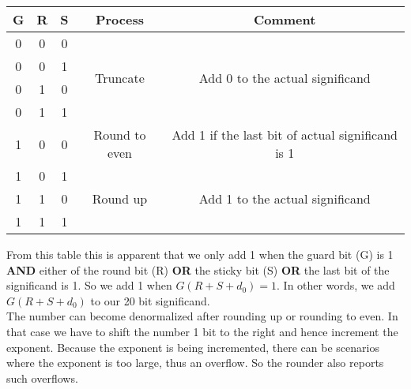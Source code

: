 \documentclass[14pt]{article}
\begin{document}
{
	\centering
	\begin{tabular}{|c|c|c|c|c|}
		\hline
		\textbf{G} & \textbf{R} & \textbf{S} & \textbf{Process} & \textbf{Comment}\\
		\hline
		0 & 0 & 0 & \multirow{4}{*}{Truncate} & \multirow{4}{*}{Add 0 to the actual significand}\\
		\cline{1-3}
		0 & 0 & 1 & &\\
		\cline{1-3}
		0 & 1 & 0 & &\\
		\cline{1-3}
		0 & 1 & 1 & &\\
		\hline
		1 & 0 & 0 & Round to even & Add 1 if the last bit of actual significand is 1\\
		\hline
		1 & 0 & 1 & \multirow{3}{*}{Round up} & \multirow{3}{*}{Add 1 to the actual significand}\\
		\cline{1-3}
		1 & 1 & 0 & & \\
		\cline{1-3}
		1 & 1 & 1 & & \\
		\hline
	\end{tabular}\par
}
From this table this is apparent that we only add 1 when the guard bit (G) is 1 \textbf{AND} either of the round bit (R) \textbf{OR} the sticky bit (S) \textbf{OR} the last bit of the significand is 1. So we add 1 when $G(R + S + d_0) = 1$. In other words, we add $G(R + S + d_0)$ to our 20 bit significand.\\

The number can become denormalized after rounding up or rounding to even. In that case we have to shift the number 1 bit to the right and hence increment the exponent. Because the exponent is being incremented, there can be scenarios where the exponent is too large, thus an overflow. So the rounder also reports such overflows.
\end{document}
